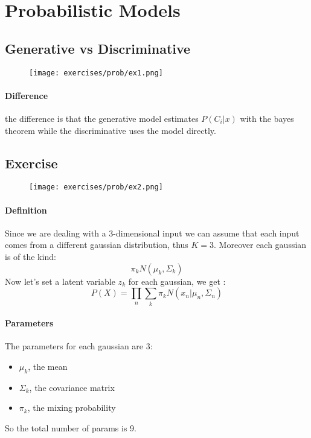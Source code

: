 \section{Probabilistic Models}

\subsection{Generative vs Discriminative}

\begin{figure}[H]
    \centering
    \texttt{[image: exercises/prob/ex1.png]}
\end{figure}

\paragraph{Difference}
the difference is that the generative model estimates $P(C_i|x)$ with the bayes theorem while the discriminative uses the model directly.


\subsection{Exercise}

\begin{figure}[H]
    \centering
    \texttt{[image: exercises/prob/ex2.png]}
\end{figure}

\paragraph{Definition}
Since we are dealing with a 3-dimensional input we can assume that each input comes from a different gaussian distribution, thus $K=3$. Moreover each gaussian is of the kind:
$$\pi_k N(\mu_k,\Sigma_k)$$
Now let's set a latent variable $z_k$ for each gaussian, we get :
$$P(X)=\prod_n \sum_k \pi_k N(x_n|\mu_n,\Sigma_n)$$

\paragraph{Parameters}
The parameters for each gaussian are 3:
\begin{itemize}
\item $\mu_k$, the mean
\item $\Sigma_k$, the covariance matrix
\item $\pi_k$, the mixing probability
\end{itemize}
So the total number of params is 9.

